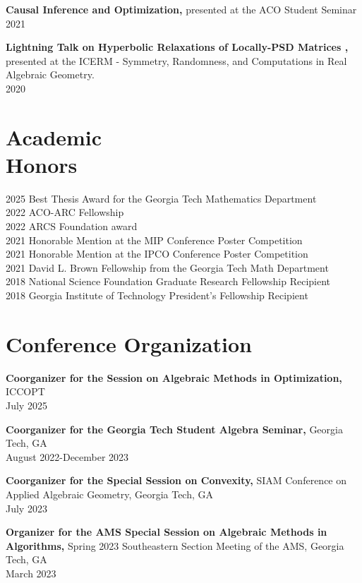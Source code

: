\documentclass[margin]{res}
\begin{document}
\begin{resume}
{\bf  Causal Inference and Optimization,} presented at the ACO Student Seminar \\ 2021

{\bf  Lightning Talk on Hyperbolic Relaxations of Locally-PSD Matrices ,} presented at the ICERM - Symmetry, Randomness, and Computations in Real Algebraic Geometry.
 \\ 2020



\section{Academic \\ Honors} 
2025 Best Thesis Award for the Georgia Tech Mathematics Department\\
2022 ACO-ARC Fellowship\\
2022 ARCS Foundation award\\
2021 Honorable Mention at the MIP Conference Poster Competition\\
2021 Honorable Mention at the IPCO Conference Poster Competition\\
2021 David L. Brown Fellowship from the Georgia Tech Math Department\\
2018 National Science Foundation Graduate Research Fellowship Recipient\\
2018 Georgia Institute of Technology President's Fellowship Recipient

\section{Conference Organization}
{\bf Coorganizer for the Session on Algebraic Methods in Optimization,} ICCOPT    \\       July 2025

{\bf Coorganizer for the Georgia Tech Student Algebra Seminar,} Georgia Tech, GA    \\       August 2022-December 2023

{\bf Coorganizer for the Special Session on Convexity,} SIAM Conference on Applied Algebraic Geometry, Georgia Tech, GA    \\       July 2023

{\bf Organizer for the AMS Special Session on Algebraic Methods in Algorithms,} Spring 2023 Southeastern Section Meeting of the AMS, Georgia Tech, GA    \\       March 2023


\end{resume}
\end{document}
